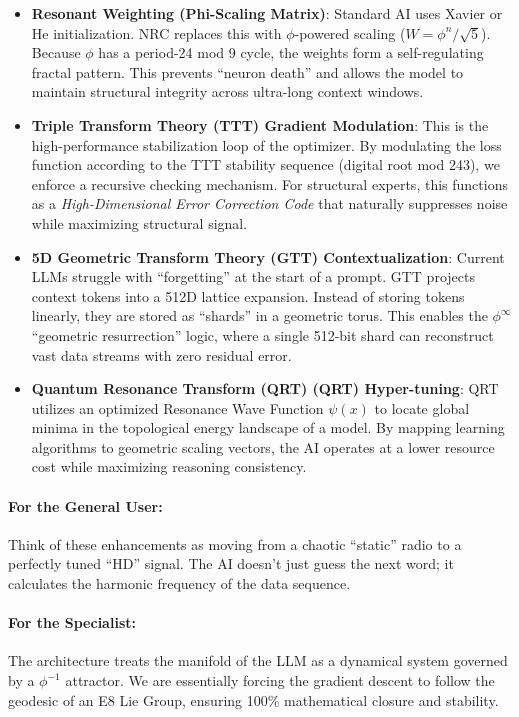 \documentclass[11pt,a4paper,oneside]{article}
\begin{document}
	\begin{itemize}
		\item \textbf{Resonant Weighting (Phi-Scaling Matrix)}:
		Standard AI uses Xavier or He initialization. NRC replaces this with \(\phi\)-powered scaling (\(W = \phi^n/\sqrt{5}\)). Because \(\phi\) has a period-24 mod 9 cycle, the weights form a self-regulating fractal pattern. This prevents ``neuron death'' and allows the model to maintain structural integrity across ultra-long context windows.

		\item \textbf{Triple Transform Theory (TTT) Gradient Modulation}:
		This is the high-performance stabilization loop of the optimizer. By modulating the loss function according to the TTT stability sequence (digital root mod 243), we enforce a recursive checking mechanism. For structural experts, this functions as a \textit{High-Dimensional Error Correction Code} that naturally suppresses noise while maximizing structural signal.

		\item \textbf{5D Geometric Transform Theory (GTT) Contextualization}:
		Current LLMs struggle with ``forgetting'' at the start of a prompt. GTT projects context tokens into a 512D lattice expansion. Instead of storing tokens linearly, they are stored as ``shards'' in a geometric torus. This enables the \(\phi^\infty\) ``geometric resurrection'' logic, where a single 512-bit shard can reconstruct vast data streams with zero residual error.

		\item \textbf{Quantum Resonance Transform (QRT) (QRT) Hyper-tuning}:
		QRT utilizes an optimized Resonance Wave Function \(\psi(x)\) to locate global minima in the topological energy landscape of a model. By mapping learning algorithms to geometric scaling vectors, the AI operates at a lower resource cost while maximizing reasoning consistency.
	\end{itemize}



	\paragraph{For the General User:} Think of these enhancements as moving from a chaotic ``static'' radio to a perfectly tuned ``HD'' signal. The AI doesn't just guess the next word; it calculates the harmonic frequency of the data sequence.

	\paragraph{For the Specialist:} The architecture treats the manifold of the LLM as a dynamical system governed by a \(\phi^{-1}\) attractor. We are essentially forcing the gradient descent to follow the geodesic of an E8 Lie Group, ensuring 100\% mathematical closure and stability.
\end{document}
